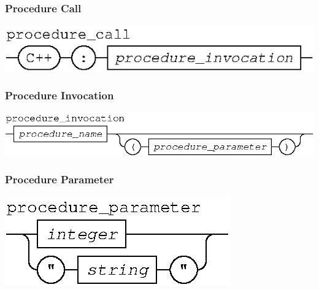 \documentclass[11pt]{article}
\begin{document}
%
\subsubsection{Procedure Call }

\begin{center}
\includegraphics{procedure_call}
\end{center}
%

%
\subsubsection{Procedure Invocation }

\begin{center}
\includegraphics{procedure_invocation}
\end{center}
%

%
\subsubsection{Procedure Parameter }

\begin{center}
\includegraphics{procedure_parameter}
\end{center}
%
%
%
\end{document}

